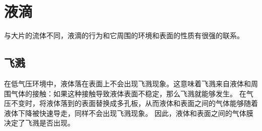 \chapter{液滴}

与大片的流体不同，液滴的行为和它周围的环境和表面的性质有很强的联系。

\section{飞溅}

在低气压环境中，液体落在表面上不会出现飞溅现象。这意味着飞溅来自液体和周围气体的接触：如果这种接触导致液体表面不稳定，那么飞溅就能够发生。
在气压不变时，将液体落到的表面替换成多孔板，从而液体和表面之间的气体能够随着液体下降被快速导走，同样不会出现飞溅现象。
因此，液体和表面之间的气体膜决定了飞溅是否出现。

